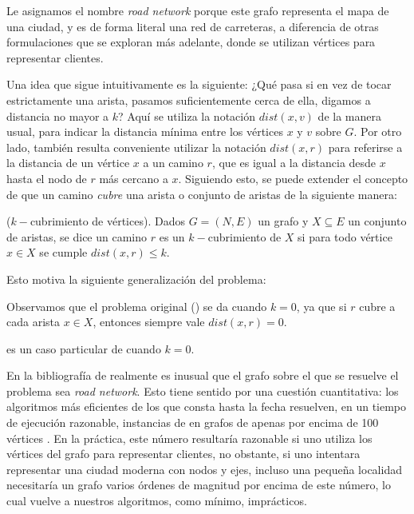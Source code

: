 
Le asignamos el nombre \emph{road network} porque este grafo representa el mapa de una ciudad, y es de forma literal una red de carreteras, a diferencia de otras formulaciones que se exploran más adelante, donde se utilizan vértices para representar clientes.

Una idea que sigue intuitivamente es la siguiente: ¿Qué pasa si en vez de tocar estrictamente una arista, pasamos suficientemente cerca de ella, digamos a distancia no mayor a $k$? Aquí se utiliza la notación $dist(x, v)$ de la manera usual, para indicar la distancia mínima entre los vértices $x$ y $v$ sobre $G$. Por otro lado, también resulta conveniente utilizar la notación $dist(x, r)$ para referirse a la distancia de un vértice $x$ a un camino $r$, que es igual a la distancia desde $x$ hasta el nodo de $r$ más cercano a $x$. Siguiendo esto, se puede extender el concepto de que un camino \emph{cubre} una arista o conjunto de aristas de la siguiente manera:

\begin{definition}
($k-$cubrimiento de vértices).
Dados $G = (N, E)$ un grafo y $X \subseteq E$ un conjunto de aristas, se dice un camino $r$ es un $k-$cubrimiento de $X$ si para todo vértice $x \in X$ se cumple $dist(x, r) \leq k$. 
\end{definition}

Esto motiva la siguiente generalización del problema:


Observamos que el problema original () se da cuando $k=0$, ya que si $r$ cubre a cada arista $x \in X$, entonces siempre vale $dist(x, r) = 0$. 

\begin{observation}
 es un caso particular de  cuando $k=0$.
\end{observation}

En la bibliografía de  realmente es inusual que el grafo sobre el que se resuelve el problema sea \emph{road network}. Esto tiene sentido por una cuestión cuantitativa: los algoritmos más eficientes de los que consta hasta la fecha resuelven, en un tiempo de ejecución razonable, instancias de  en grafos de apenas por encima de 100 vértices \cite{laporte}. En la práctica, este número resultaría razonable si uno utiliza los vértices del grafo para representar clientes, no obstante, si uno intentara representar una ciudad moderna con nodos y ejes, incluso una pequeña localidad necesitaría un grafo varios órdenes de magnitud por encima de este número, lo cual vuelve a nuestros algoritmos, como mínimo, imprácticos.
 
